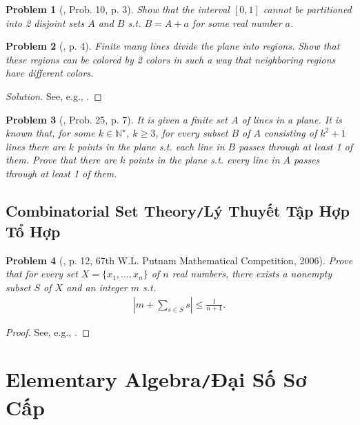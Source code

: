 \documentclass[oneside]{book}
\numberwithin{equation}{section}
\newtheorem{problem}{Problem}[section]
\begin{document}
\begin{problem}[\cite{Gelca_Andreescu2017}, Prob. 10, p. 3]
	Show that the interval $[0,1]$ cannot be partitioned into 2 disjoint sets $A$ and $B$ s.t. $B = A + a$ for some real number $a$.
\end{problem}

\begin{problem}[\cite{Gelca_Andreescu2017}, p. 4]
	Finite many lines divide the plane into regions. Show that these regions can be colored by 2 colors in such a way that neighboring regions have different colors.
\end{problem}

\begin{proof}[Solution]
	See, e.g., \cite[p. 4]{Gelca_Andreescu2017}.
\end{proof}

\begin{problem}[\cite{Gelca_Andreescu2017}, Prob. 25, p. 7]
	It is given a finite set $A$ of lines in a plane. It is known that, for some $k\in\mathbb{N}^\star$, $k\ge 3$, for every subset $B$ of $A$ consisting of $k^2 + 1$ lines there are $k$ points in the plane s.t. each line in $B$ passes through at least 1 of them. Prove that there are $k$ points in the plane s.t. every line in $A$ passes through at least 1 of them.
\end{problem}

\section{Combinatorial Set Theory\texttt{/}Lý Thuyết Tập Hợp Tổ Hợp}

\begin{problem}[\cite{Gelca_Andreescu2017}, p. 12, 67th W.L. Putnam Mathematical Competition, 2006]
	Prove that for every set $X = \{x_1,\ldots,x_n\}$ of $n$ real numbers, there exists a nonempty subset $S$ of $X$ and an integer $m$ s.t.
	\begin{align*}
		\left|m + \sum_{s\in S} s\right|\le\frac{1}{n + 1}.
	\end{align*}
\end{problem}

\begin{proof}[Proof]
	See, e.g., \cite[p. 12]{Gelca_Andreescu2017}.
\end{proof}


\chapter{Elementary Algebra\texttt{/}Đại Số Sơ Cấp}
\end{document}
